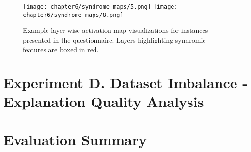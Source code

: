 \documentclass[../report.tex]{subfiles}
\begin{document}
            \begin{sidewaysfigure}
    	\texttt{[image: chapter6/syndrome\_maps/5.png]}
    	    	\texttt{[image: chapter6/syndrome\_maps/8.png]}
    	
    	\caption[Example layer-wise activation map visualizations for instances presented in the questionnaire]{Example layer-wise activation map visualizations for instances presented in the questionnaire. Layers highlighting syndromic features are boxed in red.}
    	\label{fig_layer_quest}	
    \end{sidewaysfigure}
    
    
 
%
%




	\section{Experiment D. Dataset Imbalance - Explanation Quality Analysis}

    \section{Evaluation Summary}
\end{document}
